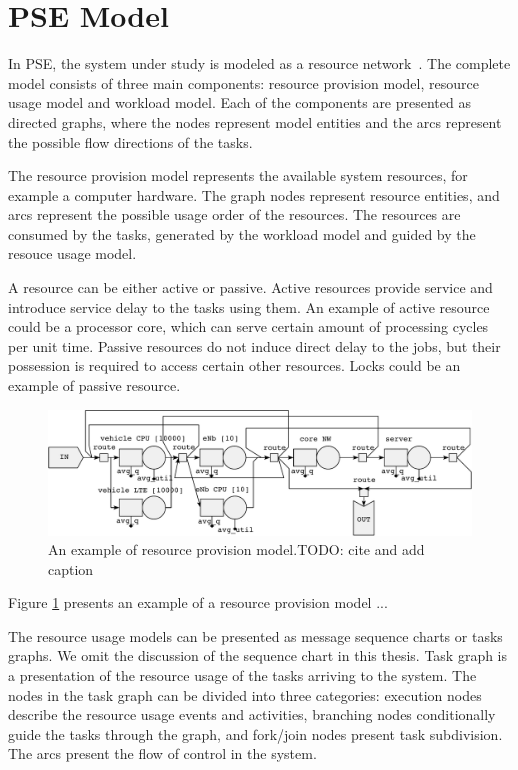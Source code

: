 \section{PSE Model}

In PSE, the system under study is modeled as a resource network~\cite{Menasce:1994:CPP:174466}. The complete model consists of three main components: resource provision model, resource usage model and workload model. Each of the components are presented as directed graphs, where the nodes represent model entities and the arcs represent the possible flow directions of the tasks.

The resource provision model represents the available system resources, for example a computer hardware. The graph nodes represent resource entities, and arcs represent the possible usage order of the resources. The resources are consumed by the tasks, generated by the workload model and guided by the resouce usage model.

A resource can be either active or passive. Active resources provide service and introduce service delay to the tasks using them. An example of active resource could be a processor core, which can serve certain amount of processing cycles per unit time. Passive resources do not induce direct delay to the jobs, but their possession is required to access certain other resources. Locks could be an example of passive resource.

\begin{figure}[]
  \begin{center}
    \includegraphics[width=\textwidth]{images/pse-rne-example-crop.pdf}
    \caption{An example of resource provision model.TODO: cite and add caption}
    \label{fig:resource-provision-model}
  \end{center}

\end{figure}

Figure \ref{fig:resource-provision-model} presents an example of a resource provision model ...

The resource usage models can be presented as message sequence charts or tasks graphs. We omit the discussion of the sequence chart in this thesis. Task graph is a presentation of the resource usage of the tasks arriving to the system. The nodes in the task graph can be divided into three categories: execution nodes describe the resource usage events and activities, branching nodes conditionally guide the tasks through the graph, and fork/join nodes present task subdivision. The arcs present the flow of control in the system.

